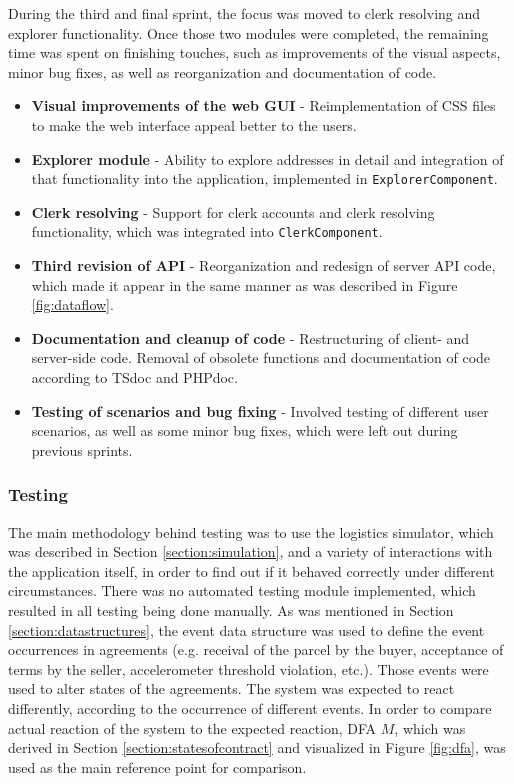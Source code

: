 During the third and final sprint, the focus was moved to clerk resolving and explorer functionality. Once those two modules were completed, the remaining time was spent on finishing touches, such as improvements of the visual aspects, minor bug fixes, as well as reorganization and documentation of code.

\begin{itemize}

\item \textbf{Visual improvements of the web GUI} - Reimplementation of CSS files to make the web interface appeal better to the users.

\item \textbf{Explorer module} - Ability to explore addresses in detail and integration of that functionality into the application, implemented in \texttt{ExplorerComponent}.

\item \textbf{Clerk resolving} - Support for clerk accounts and clerk resolving functionality, which was integrated into \texttt{ClerkComponent}.

\item \textbf{Third revision of API} - Reorganization and redesign of server API code, which made it appear in the same manner as was described in Figure \ref{fig:dataflow}.

\item \textbf{Documentation and cleanup of code} - Restructuring of client- and server-side code. Removal of obsolete functions and documentation of code according to TSdoc and PHPdoc.

\item \textbf{Testing of scenarios and bug fixing} - Involved testing of different user scenarios, as well as some minor bug fixes, which were left out during previous sprints.
\end{itemize}

\subsubsection{Testing}

The main methodology behind testing was to use the logistics simulator, which was described in Section \ref{section:simulation}, and a variety of interactions with the application itself, in order to find out if it behaved correctly under different circumstances. There was no automated testing module implemented, which resulted in all testing being done manually. As was mentioned in Section \ref{section:datastructures}, the event data structure was used to define the event occurrences in agreements (e.g. receival of the parcel by the buyer, acceptance of terms by the seller, accelerometer threshold violation, etc.). Those events were used to alter states of the agreements. The system was expected to react differently, according to the occurrence of different events. In order to compare actual reaction of the system to the expected reaction, DFA $M$, which was derived in Section \ref{section:statesofcontract} and visualized in Figure \ref{fig:dfa}, was used as the main reference point for comparison.


